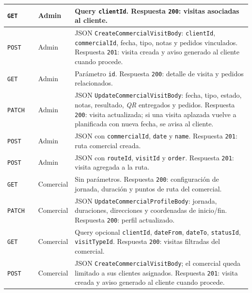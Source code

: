 {\apiTableSetup
{}
\tablefirsthead{\apiHeader}
\tablehead{\apiHeader}
\begin{supertabular}{|A{0.10\textwidth}|A{0.27\textwidth}|A{0.15\textwidth}|A{0.38\textwidth}|}
\texttt{GET} &  & Admin & Query \texttt{clientId}. Respuesta \texttt{200}: visitas asociadas al cliente.\\
\hline
\texttt{POST} &  & Admin & JSON \texttt{CreateCommercialVisitBody}: \texttt{clientId}, \texttt{commercialId}, fecha, tipo, notas y pedidos vinculados. Respuesta \texttt{201}: visita creada y aviso generado al cliente cuando procede.\\
\hline
\texttt{GET} &  & Admin & Parámetro \texttt{id}. Respuesta \texttt{200}: detalle de visita y pedidos relacionados.\\
\hline
\texttt{PATCH} &  & Admin & JSON \texttt{UpdateCommercialVisitBody}: fecha, tipo, estado, notas, resultado, \textit{QR} entregados y pedidos. Respuesta \texttt{200}: visita actualizada; si una visita aplazada vuelve a planificada con nueva fecha, se avisa al cliente.\\
\hline
\texttt{POST} &  & Admin & JSON con \texttt{commercialId}, \texttt{date} y \texttt{name}. Respuesta \texttt{201}: ruta comercial creada.\\
\hline
\texttt{POST} &  & Admin & JSON con \texttt{routeId}, \texttt{visitId} y \texttt{order}. Respuesta \texttt{201}: visita agregada a la ruta.\\
\hline
\texttt{GET} &  & Comercial & Sin parámetros. Respuesta \texttt{200}: configuración de jornada, duración y puntos de ruta del comercial.\\
\hline
\texttt{PATCH} &  & Comercial & JSON \texttt{UpdateCommercialProfileBody}: jornada, duraciones, direcciones y coordenadas de inicio/fin. Respuesta \texttt{200}: perfil actualizado.\\
\hline
\texttt{GET} &  & Comercial & Query opcional \texttt{clientId}, \texttt{dateFrom}, \texttt{dateTo}, \texttt{statusId}, \texttt{visitTypeId}. Respuesta \texttt{200}: visitas filtradas del comercial.\\
\hline
\texttt{POST} &  & Comercial & JSON \texttt{CreateCommercialVisitBody}; el comercial queda limitado a sus clientes asignados. Respuesta \texttt{201}: visita creada y aviso generado al cliente cuando procede.\\

\end{supertabular}}
